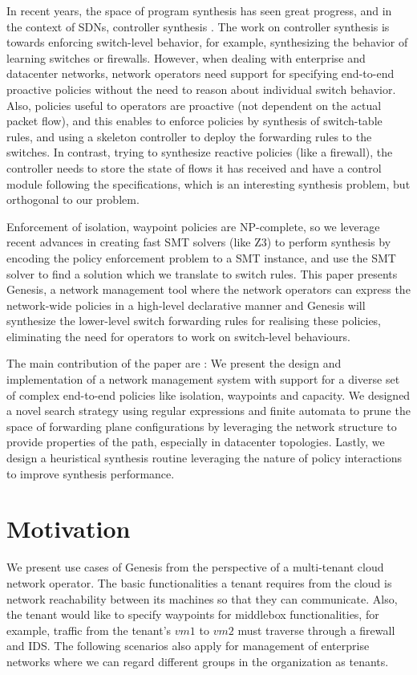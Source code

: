 \documentclass[]{sig}
\begin{document}
In recent years, the space of program synthesis has seen great progress, and in the context of SDNs, controller synthesis \cite{netegg}. The work on controller synthesis is towards enforcing switch-level behavior, for example, synthesizing the behavior of learning switches or firewalls. However, when dealing with enterprise and datacenter networks, network operators need support for specifying end-to-end proactive policies without the need to reason about individual switch behavior. Also, policies useful to operators are proactive (not dependent on the actual packet flow), and this enables to enforce policies by synthesis of switch-table rules, and using a skeleton controller to deploy the forwarding rules to the switches. In contrast, trying to synthesize reactive policies (like a firewall), the controller needs to store the state of flows it has received and have a control module following the specifications, which is an interesting synthesis problem, but orthogonal to our problem.

 Enforcement of isolation, waypoint policies are NP-complete, so we leverage recent advances in creating fast SMT solvers (like Z3) to perform synthesis by encoding the policy enforcement problem to a SMT instance, and use the SMT solver to find a solution which we translate to switch rules. This paper presents Genesis, a network management tool where the network operators can express the network-wide policies in a high-level declarative manner and Genesis will synthesize the lower-level switch forwarding rules for realising these policies, eliminating the need for operators to work on switch-level behaviours. 

The main contribution of the paper are : We present the design and implementation of a network management system with support for a diverse set of complex end-to-end policies like isolation, waypoints and capacity. We designed a novel search strategy using regular expressions and finite automata to prune the space of forwarding plane configurations by leveraging the network structure to provide properties of the path, especially in datacenter topologies. Lastly, we design a heuristical synthesis routine leveraging the nature of policy interactions to improve synthesis performance.

\section{Motivation}
We present use cases of Genesis from the perspective of a multi-tenant cloud network operator. The basic functionalities a tenant requires from the cloud is network reachability between its machines so that they can communicate. Also, the tenant would like to specify waypoints for middlebox functionalities, for example, traffic from the tenant's $vm1$ to $vm2$ must traverse through a firewall and IDS. The following scenarios also apply for management of enterprise networks where we can regard different groups in the organization as tenants. 
\end{document}
